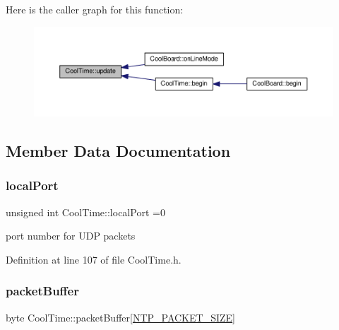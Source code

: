 Here is the caller graph for this function\+:\nopagebreak
\begin{figure}[H]
\begin{center}
\leavevmode
\includegraphics[width=350pt]{d6/d49/class_cool_time_aae601f795452cfa48d9fb337aed483a8_icgraph}
\end{center}
\end{figure}


\subsection{Member Data Documentation}
\mbox{\label{class_cool_time_a2f777da44d7ba678be8185299e9b49d1}} 
\subsubsection{\texorpdfstring{local\+Port}{localPort}}
{\footnotesize\ttfamily unsigned int Cool\+Time\+::local\+Port =0\hspace{0.3cm}{\ttfamily [private]}}

port number for U\+DP packets 

Definition at line 107 of file Cool\+Time.\+h.

\mbox{\label{class_cool_time_a27e6abc82a5c2f72161956967005bec7}} 
\subsubsection{\texorpdfstring{packet\+Buffer}{packetBuffer}}
{\footnotesize\ttfamily byte Cool\+Time\+::packet\+Buffer\mbox{[}\hyperlink{_cool_time_8h_a56a6ea64006651b4f42adf713e244f06}{N\+T\+P\+\_\+\+P\+A\+C\+K\+E\+T\+\_\+\+S\+I\+ZE}\mbox{]}\hspace{0.3cm}{\ttfamily [private]}}

